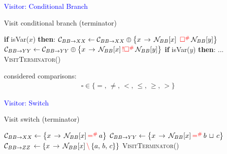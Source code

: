 \begin{frame}[fragile]{\textcolor{blue}{Visitor: Conditional Branch}}


\begin{algorithm}[H]
\caption{Visit conditional branch (terminator)}
\begin{algorithmic}[1]
\State \textbf{if } isVar($x$) \textbf{then}:
\State \qquad$\mathcal{C}_{BB\rightarrow XX} \gets  \mathcal{C}_{BB\rightarrow XX} \oplus \left\lbrace  x\,\rightarrow\, \mathcal{N}_{BB}[x]\,\,\,{\color{red}\square^\#}\,\mathcal{N}_{BB}[y]
\right\rbrace$
\State \qquad$\mathcal{C}_{BB\rightarrow YY} \gets  \mathcal{C}_{BB\rightarrow YY} \oplus \left\lbrace  x\,\rightarrow\, \mathcal{N}_{BB}[x]\,{\color{red}!\square^\#}\,\mathcal{N}_{BB}[y]
\right\rbrace$
\State \textbf{if } isVar($y$) \textbf{then}:
\State \qquad ...
\State \textsc{VisitTerminator}()
\EndProcedure
\end{algorithmic}
\end{algorithm}
considered comparisons:
\begin{align*}
\square \in \{ =,\, \neq,\, < ,\,\le,\,\ge,\, > \}
\end{align*}




\end{frame}



\begin{frame}[fragile]{\textcolor{blue}{Visitor: Switch}}

\begin{algorithm}[H]
\caption{Visit switch (terminator)}
\small
\begin{algorithmic}[1]
\State $\mathcal{C}_{BB\rightarrow XX} \gets \left\lbrace  x\,\rightarrow\, \mathcal{N}_{BB}[x]\,{\color{red}=^\#}\,a
\right\rbrace$
\State $\mathcal{C}_{BB\rightarrow YY} \gets \left\lbrace  x\,\rightarrow\, \mathcal{N}_{BB}[x]\,{\color{red}=^\#}\,b\,\sqcup\,c
\right\rbrace$
\State $\mathcal{C}_{BB\rightarrow ZZ} \,\gets \left\lbrace  x\,\rightarrow\, \mathcal{N}_{BB}[x]\,{\color{red}\backslash}\,\{a,\,b,\,c\}
\right\rbrace$
\State \textsc{VisitTerminator}()
\EndProcedure
\end{algorithmic}
\end{algorithm}


\end{frame}


